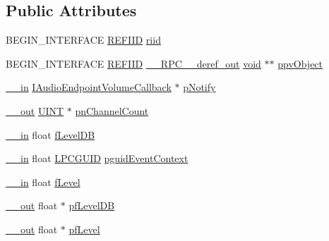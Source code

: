 \subsection*{Public Attributes}
\begin{DoxyCompactItemize}
\item 
B\+E\+G\+I\+N\+\_\+\+I\+N\+T\+E\+R\+F\+A\+CE \hyperlink{px__win__ds_8c_a80ec49c8ae61e234197d5071d2df497d}{R\+E\+F\+I\+ID} \hyperlink{struct_i_audio_endpoint_volume_vtbl_acaab0ad572e1c039ce9aef200369333d}{riid}
\item 
B\+E\+G\+I\+N\+\_\+\+I\+N\+T\+E\+R\+F\+A\+CE \hyperlink{px__win__ds_8c_a80ec49c8ae61e234197d5071d2df497d}{R\+E\+F\+I\+ID} \hyperlink{rpcsal_8h_a23bc188526f10656f9c79d950f6c3192}{\+\_\+\+\_\+\+R\+P\+C\+\_\+\+\_\+deref\+\_\+out} \hyperlink{sound_8c_ae35f5844602719cf66324f4de2a658b3}{void} $\ast$$\ast$ \hyperlink{struct_i_audio_endpoint_volume_vtbl_ac75cbe970aaa66990a92408148b6f272}{ppv\+Object}
\item 
\hyperlink{sal_8h_a3f6b8655e1aa9dfc15a9029f0343009e}{\+\_\+\+\_\+in} \hyperlink{endpointvolume_8h_abe829f734f26a7d1a40dab04b3ebbc92}{I\+Audio\+Endpoint\+Volume\+Callback} $\ast$ \hyperlink{struct_i_audio_endpoint_volume_vtbl_aa1de71932e61ca7c521fef7a8b0f4e27}{p\+Notify}
\item 
\hyperlink{sal_8h_abb4c3c1135aab6c47cff22e7c16efb74}{\+\_\+\+\_\+out} \hyperlink{mapinls_8h_a36cb3b01d81ffd844bbbfb54003e06ec}{U\+I\+NT} $\ast$ \hyperlink{struct_i_audio_endpoint_volume_vtbl_a4ab4670f69078f77e5f57ba689ed2620}{pn\+Channel\+Count}
\item 
\hyperlink{sal_8h_a3f6b8655e1aa9dfc15a9029f0343009e}{\+\_\+\+\_\+in} float \hyperlink{struct_i_audio_endpoint_volume_vtbl_aebb26eb723a88846e2002c3c2b3b65c7}{f\+Level\+DB}
\item 
\hyperlink{sal_8h_a3f6b8655e1aa9dfc15a9029f0343009e}{\+\_\+\+\_\+in} float \hyperlink{pa__win__wasapi_8c_a9c061ab1f26db8746b3dab38991f48a0}{L\+P\+C\+G\+U\+ID} \hyperlink{struct_i_audio_endpoint_volume_vtbl_a4645719eaa744e0ac977f788626cc4cc}{pguid\+Event\+Context}
\item 
\hyperlink{sal_8h_a3f6b8655e1aa9dfc15a9029f0343009e}{\+\_\+\+\_\+in} float \hyperlink{struct_i_audio_endpoint_volume_vtbl_a0c193f24aca204aced08f145e0b02ccf}{f\+Level}
\item 
\hyperlink{sal_8h_abb4c3c1135aab6c47cff22e7c16efb74}{\+\_\+\+\_\+out} float $\ast$ \hyperlink{struct_i_audio_endpoint_volume_vtbl_a29fc9372caaf42775864bdc473ccd128}{pf\+Level\+DB}
\item 
\hyperlink{sal_8h_abb4c3c1135aab6c47cff22e7c16efb74}{\+\_\+\+\_\+out} float $\ast$ \hyperlink{struct_i_audio_endpoint_volume_vtbl_a43938306c0a06c225921a63ba4041f9e}{pf\+Level}
$$
\end{DoxyCompactItemize}
